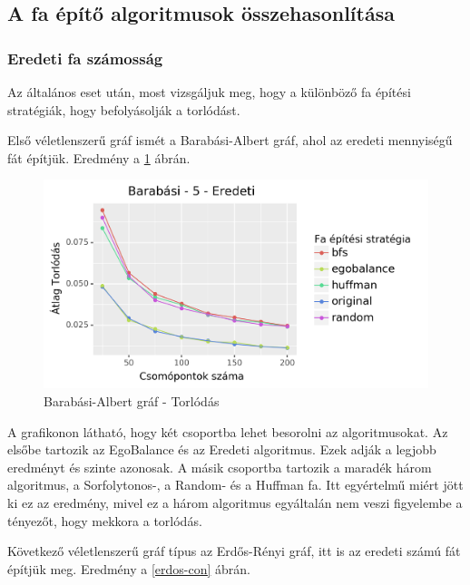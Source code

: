 \documentclass[12pt]{report}
\begin{document}
\subsection{A fa építő algoritmusok összehasonlítása}

\subsubsection{Eredeti fa számosság}

Az általános eset után, most vizsgáljuk meg, hogy a különböző fa építési stratégiák, hogy befolyásolják a torlódást.

Első véletlenszerű gráf ismét a Barabási-Albert gráf, ahol az eredeti mennyiségű fát építjük. Eredmény a \ref{barabasi-con} ábrán.

\begin{figure}[H]
	\begin{center}
		\includegraphics[width=0.9\linewidth]{pictures/barabasi_con_e.png}
		\caption{Barabási-Albert gráf - Torlódás}
		\label{barabasi-con}
	\end{center}
\end{figure}

A grafikonon látható, hogy két csoportba lehet besorolni az algoritmusokat. 
Az elsőbe tartozik az EgoBalance és az Eredeti algoritmus.
Ezek adják a legjobb eredményt és szinte azonosak.
A másik csoportba tartozik a maradék három algoritmus, a Sorfolytonos-, a Random- és a Huffman fa.
Itt egyértelmű miért jött ki ez az eredmény, mivel ez a három algoritmus egyáltalán nem veszi figyelembe a tényezőt, hogy mekkora a torlódás.

Következő véletlenszerű gráf típus az Erdős-Rényi gráf, itt is az eredeti számú fát építjük meg. 
Eredmény a \ref{erdos-con} ábrán.
\end{document}
